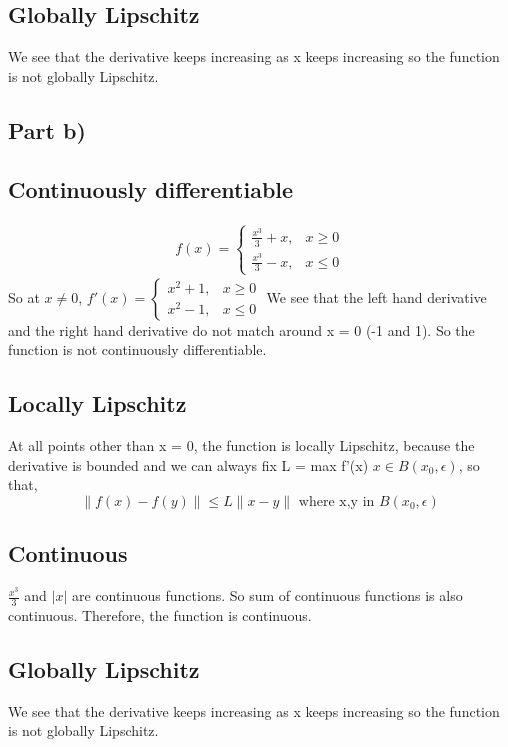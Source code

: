 \documentclass{article}
\begin{document}
\subsection*{Globally Lipschitz}
We see that the derivative keeps increasing as x keeps increasing so the function is not globally Lipschitz.

\subsection*{Part b)}
\subsection*{Continuously differentiable}
\begin{align}
    f(x)= 
\begin{cases}
    \frac{x^3}{3} + x,& x\geq 0\\
    \frac{x^3}{3} - x,  & x\leq0
\end{cases}
\end{align}
So at $x\neq0$,
$f'(x) = \begin{cases}
    x^2 + 1,& x\geq 0\\
    x^2 - 1,  & x\leq0
\end{cases}$
We see that the left hand derivative and the right hand derivative do not match around x = 0 (-1 and 1). So the function is not continuously differentiable.
\subsection*{Locally Lipschitz}
At all points other than x = 0, the function is locally Lipschitz, because the derivative is bounded and we can always fix L = max f'(x) $x \in B(x_0, \epsilon)$, so that,
\begin{equation*}
    \|f(x) - f(y)\| \leq L\|x-y\| \textrm{ where x,y in } B(x_0, \epsilon)
\end{equation*}
 
\subsection*{Continuous}
$\frac{x^3}{3}$ and $|x|$ are continuous functions. So sum of continuous functions is also continuous. Therefore, the function is continuous.

\subsection*{Globally Lipschitz}
We see that the derivative keeps increasing as x keeps increasing so the function is not globally Lipschitz.
\end{document}
